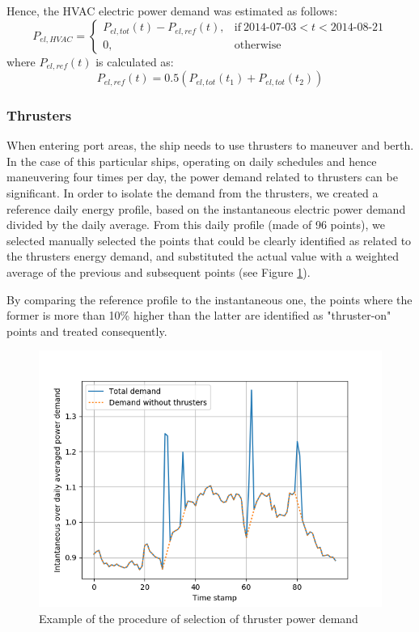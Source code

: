 \documentclass[preprint,12pt]{elsarticle}
\begin{document}
Hence, the HVAC electric power demand was estimated as follows:
\begin{equation}
P_{el,HVAC} =
\begin{cases}
P_{el,tot}(t) - P_{el,ref}(t) , & \text{if}\ \text{2014-07-03} < t < \text{2014-08-21} \\
0, & \text{otherwise}
\end{cases}
\end{equation}
where $P_{el,ref}(t)$ is calculated as:
\begin{equation}
P_{el,ref}(t) = 0.5 (P_{el,tot}(t_1) + P_{el,tot}(t_2))
\end{equation}


\subsubsection{Thrusters}

When entering port areas, the ship needs to use thrusters to maneuver and berth. In the case of this particular ships, operating on daily schedules and hence maneuvering four times per day, the power demand related to thrusters can be significant. In order to isolate the demand from the thrusters, we created a reference daily energy profile, based on the instantaneous electric power demand divided by the daily average. From this daily profile (made of 96 points), we selected manually selected the points that could be clearly identified as related to the thrusters energy demand, and substituted the actual value with a weighted average of the previous and subsequent points (see Figure \ref{fig:thruster_selection}). 

By comparing the reference profile to the instantaneous one, the points where the former is more than 10\% higher than the latter are identified as "thruster-on" points and treated consequently. 

\begin{figure}
	\centering
	\includegraphics[width=0.9\linewidth]{Figures/Thruster_selection}
	\caption{Example of the procedure of selection of thruster power demand}
	\label{fig:thruster_selection}
\end{figure}
\end{document}
